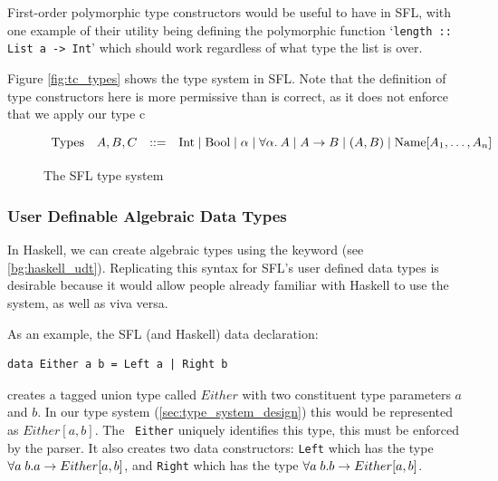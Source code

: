 First-order polymorphic type constructors would be useful to have in \ac{SFL}, with one example of their utility being defining the polymorphic function `\verb|length :: List a -> Int|' which should work regardless of what type the list is over. 

Figure \ref{fig:tc_types} shows the type system in SFL. Note that the definition of type constructors here is more permissive than is correct, as it does not enforce that we apply our type c

% 


\begin{figure}
    \[
        \begin{array}{llcl}
            \text{Types} & A, B, C & \mathrel{::=} &
                \text{Int} \mathrel{\mid} 
                \text{Bool} \mathrel{\mid} 
                \alpha \mathrel{\mid} \forall\alpha.\:{A} \mathrel{\mid} 
                A \rightarrow B \mathrel{\mid} (A, B) \mathrel{\mid} \text{Name}[A_1, \dots, A_n]
            \\[2pt]
        \end{array}
    \]
    \caption{The SFL type system}
    \label{fig:sfl_types_no_exst}
\end{figure}

\subsubsection{User Definable Algebraic Data Types}
In Haskell, we can create algebraic types using the  keyword (see \ref{bg:haskell_udt}). Replicating this syntax for \ac{SFL}'s user defined data types is desirable because it would allow people already familiar with Haskell to use the system, as well as viva versa. 

As an example, the SFL (and Haskell) data declaration:
\begin{lstlisting}[language=SFL_unboxed_noprelude]
data Either a b = Left a | Right b
\end{lstlisting}
\noindent creates a tagged union type called $Either$ with two constituent type parameters $a$ and $b$. In our type system (\ref{sec:type_system_design}) this would be represented as $Either[a, b]$. The \Unionname 
 \ \verb|Either| uniquely identifies this type, this must be enforced by the parser. It also creates two data constructors: \verb|Left| which has the type $\forall a\;b. a \rightarrow Either[a,b]$, and \verb|Right| which has the type $\forall a\;b. b \rightarrow Either[a,b]$. 


